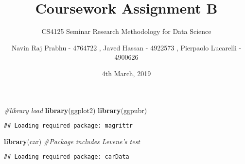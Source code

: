 \documentclass[]{article}
\title{Coursework Assignment B}
\subtitle{CS4125 Seminar Research Methodology for Data Science}
\author{Navin Raj Prabhu - 4764722 , Javed Hassan - 4922573 , Pierpaolo
Lucarelli - 4900626}
\date{4th March, 2019}
\newenvironment{Shaded}{\begin{snugshade}}{\end{snugshade}}
\newcommand{\KeywordTok}[1]{\textcolor[rgb]{0.13,0.29,0.53}{\textbf{#1}}}
\newcommand{\CommentTok}[1]{\textcolor[rgb]{0.56,0.35,0.01}{\textit{#1}}}
\newcommand{\NormalTok}[1]{#1}
\begin{document}
\maketitle

\begin{Shaded}
\begin{Highlighting}[]
\CommentTok{#library load}
\KeywordTok{library}\NormalTok{(ggplot2)}
\KeywordTok{library}\NormalTok{(ggpubr)}
\end{Highlighting}
\end{Shaded}

\begin{verbatim}
## Loading required package: magrittr
\end{verbatim}

\begin{Shaded}
\begin{Highlighting}[]
\KeywordTok{library}\NormalTok{(car) }\CommentTok{#Package includes Levene's test }
\end{Highlighting}
\end{Shaded}

\begin{verbatim}
## Loading required package: carData
\end{verbatim}
\end{document}
